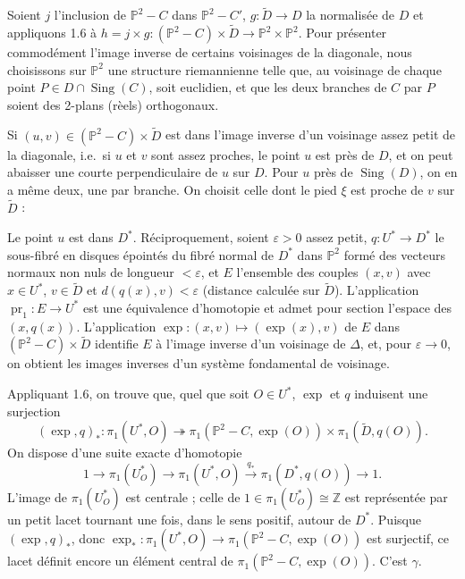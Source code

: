 \documentclass[12pt,a4paper]{article}
\DeclareMathOperator{\Sing}{Sing}
\DeclareMathOperator{\pr}{pr}
\begin{document}
Soient $j$ l'inclusion de $\mathbb{P}^2 - C$ dans $\mathbb{P}^2 - C'$, $g : \widetilde{D} \to D$ la normalisée de $D$ et appliquons 1.6 à $h = j \times g : (\mathbb{P}^2 - C) \times \widetilde{D} \to \mathbb{P}^2 \times \mathbb{P}^2$. Pour présenter commodément l'image inverse de certains voisinages de la diagonale, nous choisissons sur $\mathbb{P}^2$ une structure riemannienne telle que, au voisinage de chaque point $P \in D \cap \Sing(C)$, soit euclidien, et que les deux branches de $C$ par $P$ soient des 2-plans (rèels) orthogonaux.

Si $(u, v) \in (\mathbb{P}^2 - C) \times \widetilde{D}$ est dans l'image inverse d'un voisinage assez petit de la diagonale, i.e.\ si $u$ et $v$ sont assez proches, le point $u$ est près de $D$, et on peut abaisser une courte perpendiculaire de $u$ sur $D$. Pour $u$ près de $\Sing(D)$, on en a même deux, une par branche. On choisit celle dont le pied $\xi$ est proche de $v$ sur $\widetilde{D}$ :

Le point $u$ est dans $D^*$. Réciproquement, soient $\varepsilon > 0$ assez petit, $q : U^* \to D^*$ le sous-fibré en disques épointés du fibré normal de $D^*$ dans $\mathbb{P}^2$ formé des vecteurs normaux non nuls de longueur $< \varepsilon$, et $E$ l'ensemble des couples $(x, v)$ avec $x \in U^*$, $v \in \widetilde{D}$ et $d(q(x), v) < \varepsilon$ (distance calculée sur $\widetilde{D}$). L'application $\pr_1 : E \to U^*$ est une équivalence d'homotopie et admet pour section l'espace des $(x, q(x))$. L'application $\exp : (x, v) \mapsto (\exp(x), v)$ de $E$ dans $(\mathbb{P}^2 - C) \times \widetilde{D}$ identifie $E$ à l'image inverse d'un voisinage de $\Delta$, et, pour $\varepsilon \to 0$, on obtient les images inverses d'un système fondamental de voisinage.

Appliquant 1.6, on trouve que, quel que soit $O \in U^*$, $\exp$ et $q$ induisent une surjection
\[
(\exp, q)_* : \pi_1(U^*, O) \twoheadrightarrow \pi_1(\mathbb{P}^2 - C, \exp(O)) \times \pi_1(\widetilde{D}, q(O)).
\]
On dispose d'une suite exacte d'homotopie
\[
1 \longrightarrow \pi_1(U^*_O) \longrightarrow \pi_1(U^*, O) \xrightarrow{\;q_*\;} \pi_1(D^*, q(O)) \longrightarrow 1.
\]
L'image de $\pi_1(U^*_O)$ est centrale ; celle de $1 \in \pi_1(U^*_O) \cong \mathbb{Z}$ est représentée par un petit lacet tournant une fois, dans le sens positif, autour de $D^*$. Puisque $(\exp, q)_*$, donc $\exp_* : \pi_1(U^*, O) \to \pi_1(\mathbb{P}^2 - C, \exp(O))$ est surjectif, ce lacet définit encore un élément central de $\pi_1(\mathbb{P}^2 - C, \exp(O))$. C'est $\gamma$.
\end{document}
